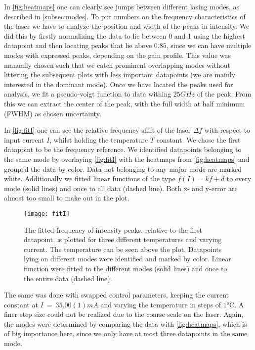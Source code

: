 In \autoref{fig:heatmaps} one can clearly see jumps between different lasing modes, as described in \autoref{subsec:modes}. To put numbers on the frequency characteristics of the laser we have to analyze the position and width of the peaks in intensity. We did this by firstly normalizing the data to lie between 0 and 1 using the highest datapoint and then locating peaks that lie above $0.85$, since we can have multiple modes with expressed peaks, depending on the gain profile. This value was manually chosen such that we catch prominent overlapping modes without littering the subsequent plots with less important datapoints (we are mainly interested in the dominant mode). Once we have located the peaks used for analysis, we fit a pseudo-voigt function to data withing $25 \unit{GHz}$ of the peak. From this we can extract the center of the peak, with the full width at half minimum (FWHM) as chosen uncertainty.

In \autoref{fig:fitI} one can see the relative frequency shift of the laser $\Delta f$ with respect to input current $I$, whilst holding the temperature $T$ constant. We chose the first datapoint to be the frequency reference. We identified datapoints belonging to the same mode by overlaying \autoref{fig:fitI} with the heatmaps from \autoref{fig:heatmaps} and grouped the data by color. Data not belonging to any major mode are marked white. Additionally we fitted linear functions of the type $f(I) = kf + d$ to every mode (solid lines) and once to all data (dashed line). Both x- and y-error are almost too small to make out in the plot. 

\begin{figure}[H]
	\centering
	\texttt{[image: fitI]}
	\caption{The fitted frequency of intensity peaks, relative to the first datapoint, is plotted for three different temperatures and varying current. The temperature can be seen above the plot. Datapoints lying on different modes were identified and marked by color. Linear function were fitted to the different modes (solid lines) and once to the entire data (dashed line).}
	\label{fig:fitI}
\end{figure}

The same was done with swapped control parameters, keeping the current constant at $I~=~35.00(1) \unit{mA}$  and varying the temperature in steps of $1 \unit{\degreeCelsius}$. A finer step size could not be realized due to the coarse scale on the laser. Again, the modes were determined by comparing the data with \autoref{fig:heatmaps}, which is of big importance here, since we only have at  most three datapoints in the same mode.

